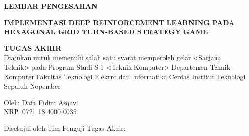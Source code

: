 \begin{center}
	\large
  \textbf{LEMBAR PENGESAHAN}
\end{center}

\thispagestyle{empty}

\begin{center}
  \textbf{IMPLEMENTASI DEEP REINFORCEMENT LEARNING PADA HEXAGONAL GRID TURN-BASED STRATEGY GAME}
\end{center}

\begingroup
  \small
  

  \begin{center}
    \textbf{TUGAS AKHIR}
    \\Diajukan untuk memenuhi salah satu syarat memperoleh gelar <Sarjana Teknik> pada Program Studi S-1 <Teknik Komputer> Departemen Teknik Komputer Fakultas Teknologi Elektro dan Informatika Cerdas Institut Teknologi Sepuluh Nopember
  \end{center}


  \begin{center}
    Oleh: Dafa Fidini Asqav 
    \\NRP. 0721 18 4000 0035
  \end{center}



  \begin{center}
    Disetujui oleh Tim Penguji Tugas Akhir:
  \end{center}


  \begingroup
    \setlength{\tabcolsep}{0pt}

